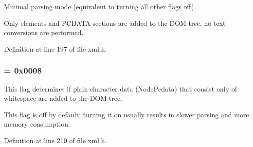 Minimal parsing mode (equivalent to turning all other flags off). 

Only elements and PCDATA sections are added to the DOM tree, no text conversions are performed. 

Definition at line 197 of file xml.h.

\hypertarget{namespacephys_1_1xml_a48c0da99d1ed62b1a4984293e64828c6}{
\subsubsection[{ParseWsPcdata}]{ = 0x0008}}
\label{d9/d27/namespacephys_1_1xml_a48c0da99d1ed62b1a4984293e64828c6}


This flag determines if plain character data (NodePcdata) that consist only of whitespace are added to the DOM tree. 

This flag is off by default; turning it on usually results in slower parsing and more memory consumption. 

Definition at line 210 of file xml.h.

